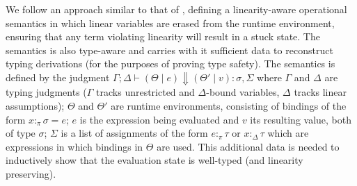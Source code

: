 \documentclass[acmsmall,review,anonymous,screen]{acmart}
\begin{document}
We follow an approach
similar to that of \cite{cite:linearhaskell}, defining a
linearity-aware operational semantics in which linear variables are
erased from 
the runtime environment, ensuring that any term violating linearity
will result in a stuck state. The semantics is also type-aware and
carries with it sufficient data to reconstruct typing derivations (for
the purposes of proving type safety). The semantics is defined by
the judgment $\Gamma ; \Delta \vdash (\Theta \mid e) \Downarrow (\Theta'
\mid v) : \sigma , \Sigma$ where $\Gamma$ and $\Delta$ are typing judgments
($\Gamma$ tracks unrestricted and $\Delta$-bound variables, $\Delta$ tracks linear
assumptions);
$\Theta$ and $\Theta'$ are runtime environments, consisting of bindings of the form
$x :_\pi \sigma = e$; $e$ is the expression being evaluated and $v$
its resulting value, both of type $\sigma$; $\Sigma$ is a list of assignments of the form
$e :_\pi \tau$ or $x :_\Delta \tau$ which are expressions in which
bindings in $\Theta$ are used. This additional data is needed to
inductively show that the evaluation state is well-typed (and
linearity preserving).
\end{document}
